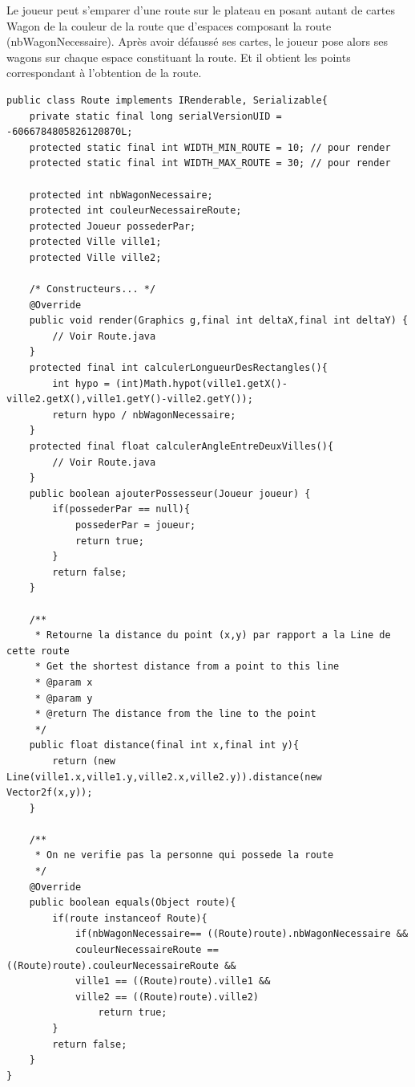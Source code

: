 \documentclass{report}
\begin{document}
Le joueur peut s'emparer d'une route sur le plateau en posant autant de cartes Wagon de la couleur de la route que d’espaces composant la route (nbWagonNecessaire). Après avoir défaussé ses cartes, le joueur pose alors ses wagons sur chaque espace constituant la route. Et il obtient les points correspondant à l'obtention de la route.
\begin{lstlisting}[caption=Représentation d'une route]
public class Route implements IRenderable, Serializable{
	private static final long serialVersionUID = -6066784805826120870L;
	protected static final int WIDTH_MIN_ROUTE = 10; // pour render
	protected static final int WIDTH_MAX_ROUTE = 30; // pour render

	protected int nbWagonNecessaire;
	protected int couleurNecessaireRoute;
	protected Joueur possederPar;
	protected Ville ville1;
	protected Ville ville2;
	
	/* Constructeurs... */
	@Override
	public void render(Graphics g,final int deltaX,final int deltaY) {
		// Voir Route.java
	}
	protected final int calculerLongueurDesRectangles(){
		int hypo = (int)Math.hypot(ville1.getX()-ville2.getX(),ville1.getY()-ville2.getY());
		return hypo / nbWagonNecessaire;
	}
	protected final float calculerAngleEntreDeuxVilles(){
		// Voir Route.java
	}
	public boolean ajouterPossesseur(Joueur joueur) {
		if(possederPar == null){
			possederPar = joueur;
			return true;
		}
		return false;
	}
	
	/**
	 * Retourne la distance du point (x,y) par rapport a la Line de cette route
	 * Get the shortest distance from a point to this line
	 * @param x
	 * @param y
	 * @return The distance from the line to the point
	 */
	public float distance(final int x,final int y){
		return (new Line(ville1.x,ville1.y,ville2.x,ville2.y)).distance(new Vector2f(x,y));
	}

	/**
	 * On ne verifie pas la personne qui possede la route
	 */
	@Override
	public boolean equals(Object route){
		if(route instanceof Route){
			if(nbWagonNecessaire== ((Route)route).nbWagonNecessaire &&
			couleurNecessaireRoute == ((Route)route).couleurNecessaireRoute &&
			ville1 == ((Route)route).ville1 &&
			ville2 == ((Route)route).ville2)
				return true;
		}
		return false;
	}
}
\end{lstlisting}
\end{document}
